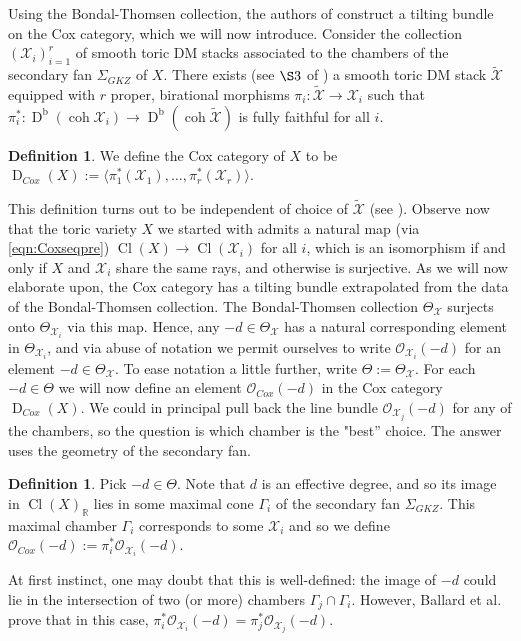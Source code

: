 \documentclass[reqno, 12pt]{amsart}
\theoremstyle{definition}
\newtheorem{definition}[theorem]{Definition}
\numberwithin{equation}{section}
\newcommand{\newterm}{\textsf}
\newcommand{\dbcoh}[1]{\operatorname{D}^{\operatorname{b}}(\operatorname{coh }#1)}
\newcommand{\R}{\mathbb{R}}
\def\O{\mathcal{O}}
\begin{document}
Using the Bondal-Thomsen collection, the authors of \cite{BBB+} construct a tilting bundle on the \newterm{Cox category}, which we will now introduce. Consider the collection $(\mathcal{X}_i)_{i=1}^r$ of smooth toric DM stacks associated to the chambers of the secondary fan $\Sigma_{GKZ}$ of $X$. There exists (see $\S 3$ of \cite{BBB+}) a smooth toric DM stack $\widetilde{\mathcal{X}}$ equipped with $r$ proper, birational morphisms $\pi_i:\widetilde{\mathcal{X}}\rightarrow \mathcal{X}_i$ such that $\pi^\ast_i:\dbcoh{\mathcal{X}_i}\rightarrow \dbcoh{\widetilde{\mathcal{X}}}$ is fully faithful for all $i$. \begin{definition}
    \label{Def:CoxCat}
    We define the Cox category of $X$ to be $\operatorname{D}_{Cox}(X):=\langle \pi_1^\ast(\mathcal{X}_1),\dots,\pi^\ast_r(\mathcal{X}_r)\rangle$.
\end{definition}
This definition turns out to be independent of choice of $\widetilde{\mathcal{X}}$ (see \cite[Corollary 3.9]{BBB+}). Observe now that the toric variety $X$ we started with admits a natural map (via \eqref{eqn:Coxseqpre}) $\operatorname{Cl}(X)\rightarrow\operatorname{Cl}(\mathcal{X}_i)$ for all $i$, which is an isomorphism if and only if $X$ and $\mathcal{X}_i$ share the same rays, and otherwise is surjective. As we will now elaborate upon, the Cox category has a tilting bundle extrapolated from the data of the Bondal-Thomsen collection. The Bondal-Thomsen collection $\Theta_\mathcal{X}$ surjects onto $\Theta_{\mathcal{X}_i}$ via this map. Hence, any $-d\in \Theta_\mathcal{X}$ has a natural corresponding element in $\Theta_{\mathcal{X}_i}$, and via abuse of notation we permit ourselves to write $\O_{\mathcal{X}_i}(-d)$ for an element $-d\in \Theta_{\mathcal{X}}$. To ease notation a little further, write $\Theta:= \Theta_{\mathcal{X}}$. For each $-d\in \Theta$ we will now define an element $\O_{Cox}(-d)$ in the Cox category $\operatorname{D}_{Cox}(X)$. We could in principal pull back the line bundle $\O_{\mathcal{X}_j}(-d)$ for any of the chambers, so the question is which chamber is the "best'' choice. The answer uses the geometry of the secondary fan.
\begin{definition} 
    \label{OCox(-d)}
    Pick $-d\in \Theta$. Note that $d$ is an effective degree, and so its image in $\operatorname{Cl}(X)_{\R}$ lies in some maximal cone $\Gamma_i$ of the secondary fan $\Sigma_{GKZ}$. This maximal chamber $\Gamma_i$ corresponds to some $\mathcal{X}_i$ and so we define $\O_{Cox}(-d):=\pi_i^\ast\O_{\mathcal{X}_i}(-d)$.
\end{definition}
At first instinct, one may doubt that this is well-defined: the image of $-d$ could lie in the intersection of two (or more) chambers $\Gamma_j\cap\Gamma_i$. However, Ballard et al. prove \cite[Proposition 4.2]{BBB+} that in this case, $\pi_i^\ast\O_{\mathcal{X}_i}(-d)=\pi^\ast_j\O_{\mathcal{X}_j}(-d)$.
\end{document}
